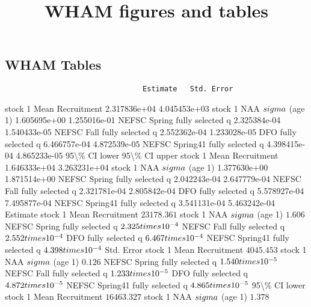 \documentclass[
]{article}
\title{WHAM figures and tables}
\author{}
\date{\vspace{-2.5em}}
\begin{document}
\maketitle

\subsection{WHAM Tables}\label{wham-tables}

\begin{verbatim}
                                Estimate   Std. Error
\end{verbatim}

stock 1 Mean Recruitment 2.317836e+04 4.045453e+03 stock 1 NAA
\(\\sigma\) (age 1) 1.605695e+00 1.255016e-01 NEFSC Spring fully
selected q 2.325384e-04 1.540433e-05 NEFSC Fall fully selected q
2.552362e-04 1.233028e-05 DFO fully selected q 6.466757e-04 4.872539e-05
NEFSC Spring41 fully selected q 4.398415e-04 4.865233e-05
95\textbackslash\% CI lower 95\textbackslash\% CI upper stock 1 Mean
Recruitment 1.646333e+04 3.263231e+04 stock 1 NAA \(\\sigma\) (age 1)
1.377630e+00 1.871514e+00 NEFSC Spring fully selected q 2.042243e-04
2.647779e-04 NEFSC Fall fully selected q 2.321781e-04 2.805842e-04 DFO
fully selected q 5.578927e-04 7.495877e-04 NEFSC Spring41 fully selected
q 3.541131e-04 5.463242e-04 Estimate stock 1 Mean Recruitment
\(23178.361\) stock 1 NAA \(\\sigma\) (age 1) \(1.606\) NEFSC Spring
fully selected q \(2.325\\times 10^{-4}\) NEFSC Fall fully selected q
\(2.552\\times 10^{-4}\) DFO fully selected q \(6.467\\times 10^{-4}\)
NEFSC Spring41 fully selected q \(4.398\\times 10^{-4}\) Std. Error
stock 1 Mean Recruitment \(4045.453\) stock 1 NAA \(\\sigma\) (age 1)
\(0.126\) NEFSC Spring fully selected q \(1.540\\times 10^{-5}\) NEFSC
Fall fully selected q \(1.233\\times 10^{-5}\) DFO fully selected q
\(4.872\\times 10^{-5}\) NEFSC Spring41 fully selected q
\(4.865\\times 10^{-5}\) 95\textbackslash\% CI lower stock 1 Mean
Recruitment \(16463.327\) stock 1 NAA \(\\sigma\) (age 1) \(1.378\)
\end{document}

